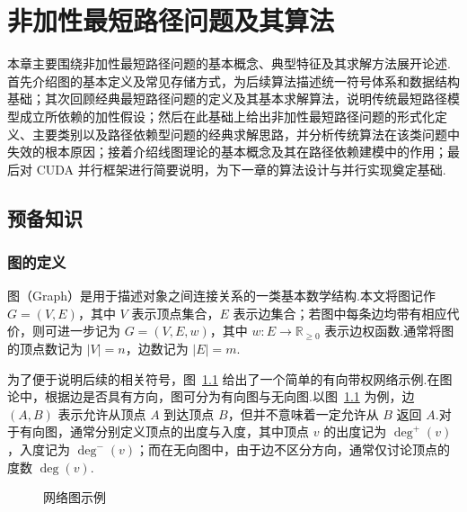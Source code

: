 
\chapter{非加性最短路径问题及其算法}

本章主要围绕非加性最短路径问题的基本概念、典型特征及其求解方法展开论述.首先介绍图的基本定义及常见存储方式，为后续算法描述统一符号体系和数据结构基础；其次回顾经典最短路径问题的定义及其基本求解算法，说明传统最短路径模型成立所依赖的加性假设；然后在此基础上给出非加性最短路径问题的形式化定义、主要类别以及路径依赖型问题的经典求解思路，并分析传统算法在该类问题中失效的根本原因；接着介绍线图理论的基本概念及其在路径依赖建模中的作用；最后对 CUDA 并行框架进行简要说明，为下一章的算法设计与并行实现奠定基础.

\section{预备知识}

\subsection{图的定义}

图（Graph）是用于描述对象之间连接关系的一类基本数学结构.本文将图记作 $G=(V,E)$，其中 $V$ 表示顶点集合，$E$ 表示边集合；若图中每条边均带有相应代价，则可进一步记为 $G=(V,E,w)$，其中 $w:E\rightarrow\mathbb{R}_{\ge 0}$ 表示边权函数.通常将图的顶点数记为 $|V|=n$，边数记为 $|E|=m$.

为了便于说明后续的相关符号，图~\ref{fig:graph_example} 给出了一个简单的有向带权网络示例.在图论中，根据边是否具有方向，图可分为有向图与无向图.以图~\ref{fig:graph_example} 为例，边 $(A,B)$ 表示允许从顶点 $A$ 到达顶点 $B$，但并不意味着一定允许从 $B$ 返回 $A$.对于有向图，通常分别定义顶点的出度与入度，其中顶点 $v$ 的出度记为 $\deg^+(v)$，入度记为 $\deg^-(v)$；而在无向图中，由于边不区分方向，通常仅讨论顶点的度数 $\deg(v)$.

\begin{figure}[H]
  \centering
  \caption{网络图示例}
  \label{fig:graph_example}
\end{figure}


